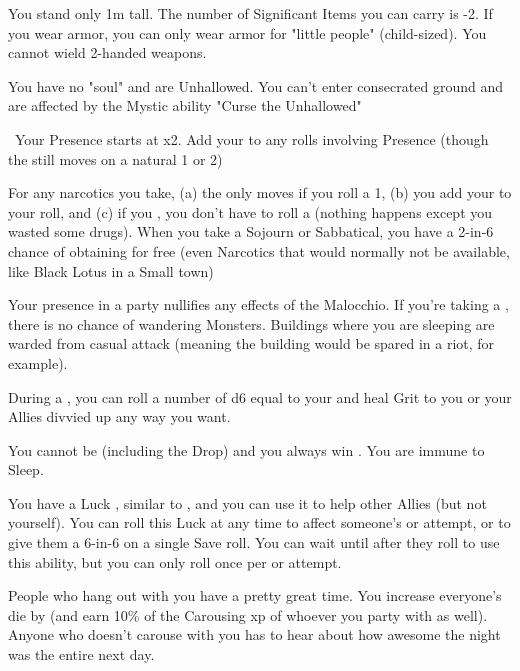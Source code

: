 {  
  You stand only 1m tall.  The number of Significant Items you can carry is -2. If you wear armor, you can only wear armor for "little people" (child-sized).  You cannot wield 2-handed weapons.

  You have no "soul" and are Unhallowed. You can't enter consecrated ground and are affected by the Mystic ability "Curse the Unhallowed"

  \
  Your Presence starts at \DCUP x2.  Add your \LVL to any rolls involving Presence (though the \UD still moves \DCDOWN on a natural 1 or 2)



  For any narcotics you take, (a) the \UD only moves \DCDOWN if you roll a 1, (b) you add your \LVL to your  roll, and (c) if you , you don't have to roll a  (nothing happens except you wasted some drugs).  When you take a Sojourn or Sabbatical, you have a 2-in-6 chance of obtaining   for free (even Narcotics that would normally not be available, like Black Lotus in a Small town)

  Your presence in a party nullifies any effects of the Malocchio.  If you're taking a , there is no chance of wandering Monsters. Buildings where you are sleeping are warded from casual attack (meaning the building would be spared in a riot, for example). 

  During a , you can roll a number of d6 equal to your \LVL and heal \SUM Grit to you or your Allies divvied up any way you want.  

  You cannot be  (including the Drop) and you always win .  You are immune to Sleep.

  You have a Luck \UD, similar to , and you can use it to help other Allies (but not yourself).  You can roll this Luck \UD at any time to affect someone's \RO or \RB attempt, or to give them a 6-in-6 on a single Save roll.  You can wait until after they roll to use this ability, but you can only roll once per \RO or \RB attempt.

  People who hang out with you have a pretty great time.  You increase everyone's  die by \DCUP (and earn 10\% of the Carousing xp of whoever you party with as well). Anyone who doesn't carouse with you has to hear about how awesome the night was the entire next day.

}
